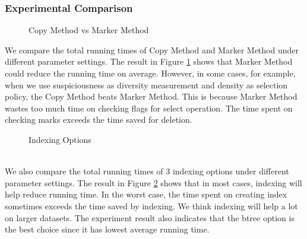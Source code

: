 \subsubsection{Experimental Comparison}
\begin{figure}[h]
    \begin{center}
    \end{center}
    \caption{Copy Method vs Marker Method}
    \label{fig:CopyMarker}
\end{figure}
We compare the total running times of Copy Method and Marker Method under different parameter settings. The result in Figure \ref{fig:CopyMarker} shows that Marker Method could reduce the running time on average. However, in some cases, for example, when we use suspiciousness as diversity measurement and density as selection policy, the Copy Method beats Marker Method. This is because Marker Method wastes too much time on checking flags for select operation. The time spent on checking marks exceeds the time saved for deletion.
\begin{figure}[h]
    \begin{center}
    \end{center}
    \caption{Indexing Options}
    \label{fig:Indexing}
\end{figure} \\

We also compare the total running times of 3 indexing options under different parameter settings. The result in Figure \ref{fig:Indexing} shows that in most cases, indexing will help reduce running time. In the worst case, the time spent on creating index sometimes exceeds the time saved by indexing. We think indexing will help a lot on larger datasets. The experiment result also indicates that the btree option is the best choice since it has lowest average running time.\\